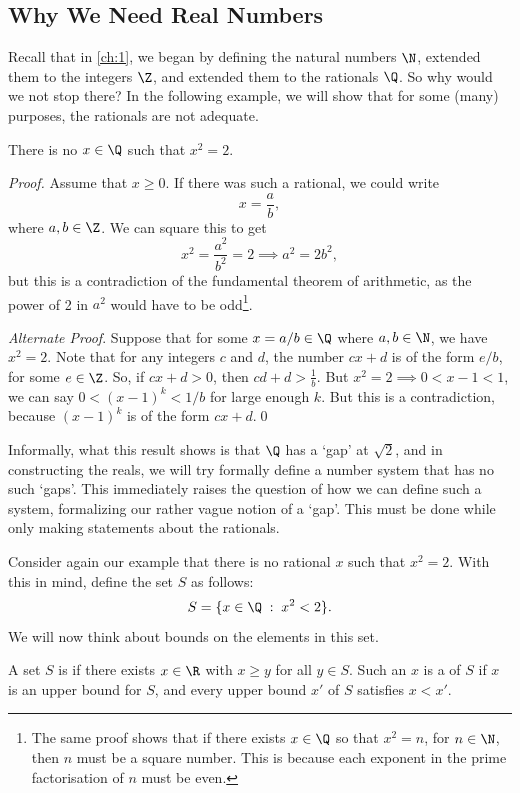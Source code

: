 \subsection{Why We Need Real Numbers}

Recall that in \autoref{ch:1}, we began by defining the natural numbers $\N$, extended them to the integers $\Z$, and extended them to the rationals $\Q$. So why would we not stop there? In the following example, we will show that for some (many) purposes, the rationals are not adequate.

\begin{proposition}
	There is no $x \in \Q$ such that $x^2 = 2$.
\end{proposition}
\begin{proof}
	Assume that $x \geq 0$. If there was such a rational, we could write
	$$
	x = \frac{a}{b},
	$$
	where $a, b \in \Z$. We can square this to get
	$$
	x^2 = \frac{a^2}{b^2} = 2 \implies a^2 = 2b^2,
	$$
	but this is a contradiction of the fundamental theorem of arithmetic, as the power of 2 in $a^2$ would have to be odd\footnote{The same proof shows that if there exists $x \in \Q$ so that $x^2 = n$, for $n \in \N$, then $n$ must be a square number. This is because each exponent in the prime factorisation of $n$ must be even.}.\hfill\qedhere

	\emph{Alternate Proof}. Suppose that for some $x = a/b \in \Q$ where $a, b \in \N$, we have $x^2 = 2$. Note that for any integers $c$ and $d$, the number $cx + d$ is of the form $e/b$, for some $e \in \Z$. So, if $cx + d > 0$, then $cd + d > \frac{1}{b}$. But $x^2 = 2 \implies 0 < x - 1 < 1$, we can say $0 < (x - 1)^k < 1/b$ for large enough $k$. But this is a contradiction, because $(x - 1)^k$ is of the form $cx + d$.\hfill\qed
\end{proof}

Informally, what this result shows is that $\Q$ has a `gap' at $\sqrt{2}$, and in constructing the reals, we will try formally define a number system that has no such `gaps'. This immediately raises the question of how we can define such a system, formalizing our rather vague notion of a `gap'. This must be done while only making statements about the rationals.  


Consider again our example that there is no rational $x$ such that $x^2 = 2$. With this in mind, define the set $S$ as follows:
$$
S = \{ x \in \Q \; : \; x^2 < 2\}.
$$
We will now think about bounds on the elements in this set.

\begin{definition}
	A set $S$ is  if there exists $x \in \R$ with $x \geq y$ for all $y \in S$. Such an $x$ is a  of $S$ if $x$ is an upper bound for $S$, and every upper bound $x'$ of $S$ satisfies $x < x'$. 
\end{definition}

